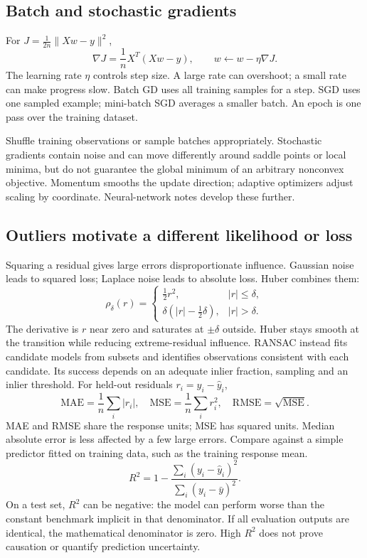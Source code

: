 \documentclass[11pt]{article}
\begin{document}
\subsection{Batch and stochastic gradients}
For $J=\tfrac1{2n}\|Xw-y\|^2$,
\[
\nabla J=\frac1nX^T(Xw-y),\qquad w\leftarrow w-\eta\nabla J.
\]
The learning rate $\eta$ controls step size. A large rate can overshoot; a small rate can make progress slow. Batch GD uses all training samples for a step. SGD uses one sampled example; mini-batch SGD averages a smaller batch. An epoch is one pass over the training dataset.

Shuffle training observations or sample batches appropriately. Stochastic gradients contain noise and can move differently around saddle points or local minima, but do not guarantee the global minimum of an arbitrary nonconvex objective. Momentum smooths the update direction; adaptive optimizers adjust scaling by coordinate. Neural-network notes develop these further.
\subsection{Outliers motivate a different likelihood or loss}
Squaring a residual gives large errors disproportionate influence. Gaussian noise leads to squared loss; Laplace noise leads to absolute loss. Huber combines them:
\[
\rho_\delta(r)=
\begin{cases}
\tfrac12r^2,&|r|\leq\delta,\\
\delta(|r|-\tfrac12\delta),&|r|>\delta.
\end{cases}
\]
The derivative is $r$ near zero and saturates at $\pm\delta$ outside. Huber stays smooth at the transition while reducing extreme-residual influence. RANSAC instead fits candidate models from subsets and identifies observations consistent with each candidate. Its success depends on an adequate inlier fraction, sampling and an inlier threshold.
For held-out residuals $r_i=y_i-\hat y_i$,
\[
\mathrm{MAE}=\frac1n\sum_i|r_i|,\quad
\mathrm{MSE}=\frac1n\sum_ir_i^2,\quad
\mathrm{RMSE}=\sqrt{\mathrm{MSE}}.
\]
MAE and RMSE share the response units; MSE has squared units. Median absolute error is less affected by a few large errors. Compare against a simple predictor fitted on training data, such as the training response mean.
\[
R^2=1-\frac{\sum_i(y_i-\hat y_i)^2}{\sum_i(y_i-\bar y)^2}.
\]
On a test set, $R^2$ can be negative: the model can perform worse than the constant benchmark implicit in that denominator. If all evaluation outputs are identical, the mathematical denominator is zero. High $R^2$ does not prove causation or quantify prediction uncertainty.
\end{document}
